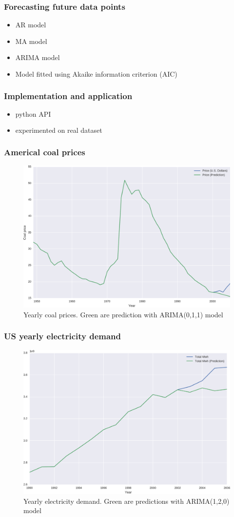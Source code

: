 \documentclass{beamer}
\begin{document}
\begin{frame}
    \frametitle{Forecasting future data points}
    \begin{itemize}
        \item AR model
        \item MA model
        \item ARIMA model
        \item Model fitted using Akaike information criterion (AIC)
    \end{itemize}
\end{frame}

\begin{frame}
    \frametitle{Implementation and application}
    \begin{itemize}
        \item python API
        \item experimented on real dataset
    \end{itemize}
\end{frame}

\begin{frame}
    \frametitle{Americal coal prices}
    \begin{figure}[]
      \centering
      \includegraphics[width=0.8\linewidth]{supply}
          \caption{Yearly coal prices. Green are prediction with ARIMA(0,1,1) model}
    \end{figure}
\end{frame}


\begin{frame}
    \frametitle{US yearly electricity demand}
    \begin{figure}[]
      \centering
      \includegraphics[width=0.8\linewidth]{demand}
      \caption{Yearly electricity demand. Green are predictions with ARIMA(1,2,0) model}
    \end{figure}
\end{frame}
\end{document}
